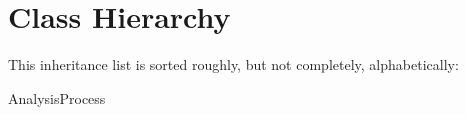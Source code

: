 \section{Class Hierarchy}
This inheritance list is sorted roughly, but not completely, alphabetically\-:\begin{DoxyCompactList}
\item Analysis\-Process\begin{DoxyCompactList}
\item {}
\end{DoxyCompactList}
\item {}
\item {}
\end{DoxyCompactList}
